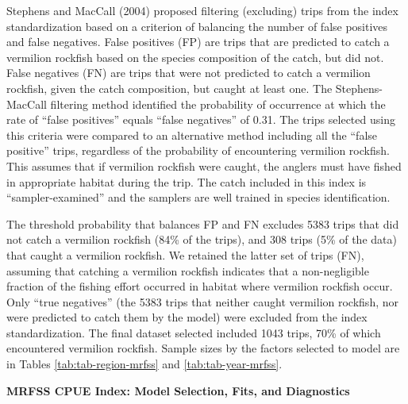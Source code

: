 \documentclass[11pt,
  english,
]{article}
\begin{document}
Stephens and MacCall {(2004)\leavevmode\tagmcend\tagstructend} proposed filtering (excluding) trips from the index standardization based on a criterion of balancing the number of false positives and false negatives. False positives (FP) are trips that are predicted to catch a vermilion rockfish based on the species composition of the catch, but did not. False negatives (FN) are trips that were not predicted to catch a vermilion rockfish, given the catch composition, but caught at least one. The Stephens-MacCall filtering method identified the probability of occurrence at which the rate of ``false positives'' equals ``false negatives'' of 0.31. The trips selected using this criteria were compared to an alternative method including all the ``false positive'' trips, regardless of the probability of encountering vermilion rockfish. This assumes that if vermilion rockfish were caught, the anglers must have fished in appropriate habitat during the trip. The catch included in this index is ``sampler-examined'' and the samplers are well trained in species identification.

The threshold probability that balances FP and FN excludes 5383 trips that did not catch a vermilion rockfish (84\% of the trips), and 308 trips (5\% of the data) that caught a vermilion rockfish. We retained the latter set of trips (FN), assuming that catching a vermilion rockfish indicates that a non-negligible fraction of the fishing effort occurred in habitat where vermilion rockfish occur. Only ``true negatives'' (the 5383 trips that neither caught vermilion rockfish, nor were predicted to catch them by the model) were excluded from the index standardization. The final dataset selected included 1043 trips, 70\% of which encountered vermilion rockfish. Sample sizes by the factors selected to model are in Tables \ref{tab:tab-region-mrfss} and \ref{tab:tab-year-mrfss}.

\textbf{MRFSS CPUE Index: Model Selection, Fits, and Diagnostics}
\end{document}
